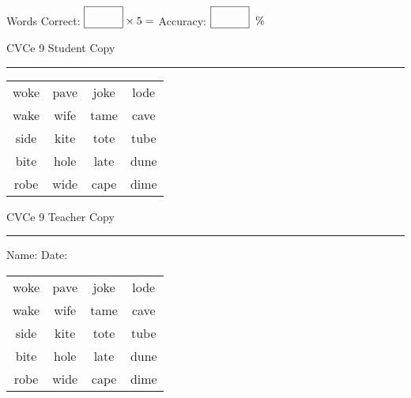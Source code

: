 \documentclass{memoir}
\begin{document}
\small

Words Correct: $\fbox{\phantom{\huge 100}} \times 5 = $ Accuracy: $\fbox{\phantom{\huge 100}}\;\; \%$ 

\vfill

\newpage


\footnotesize \noindent
CVCe 9 \hfill Student Copy
\smallskip
\hrule

\Large

\setlength{\tabcolsep}{14pt}
\def\arraystretch{2}

{\selectfont


\begin{vplace}[0.5]
\begin{center}
\begin{tabular}{cccc}
woke & pave & joke & lode \\
wake & wife & tame & cave \\
side & kite & tote & tube \\
bite & hole & late & dune \\
robe & wide & cape & dime \\
\end{tabular}
\end{center}
\end{vplace}

}

\newpage

\footnotesize \noindent
CVCe 9 \hfill Teacher Copy
\smallskip
\hrule

\small

\vfill

\noindent
Name: \underline{\hspace{1.75in}} \hfill Date: \underline{\hspace{1in}}

\Large

{\selectfont


\begin{vplace}[0.5]
\begin{center}
\begin{tabular}{cccc}
woke & pave & joke & lode \\
wake & wife & tame & cave \\
side & kite & tote & tube \\
bite & hole & late & dune \\
robe & wide & cape & dime \\
\end{tabular}
\end{center}
\end{vplace}



}
\end{document}
